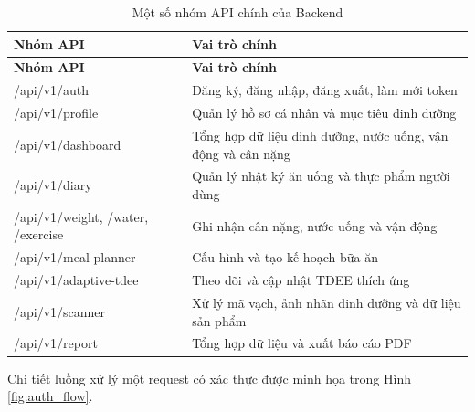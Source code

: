 \documentclass[12pt, a4paper]{report}
\begin{document}
\begin{longtable}{|>{\raggedright\arraybackslash}p{5cm}|p{10cm}|}
\caption{Một số nhóm API chính của Backend}
\label{tab:api_backend} \\
\hline
\textbf{Nhóm API} & \textbf{Vai trò chính} \\
\hline
\endfirsthead
\hline
\textbf{Nhóm API} & \textbf{Vai trò chính} \\
\hline
\endhead

/api/v1/auth & Đăng ký, đăng nhập, đăng xuất, làm mới token \\
\hline
/api/v1/profile & Quản lý hồ sơ cá nhân và mục tiêu dinh dưỡng \\
\hline
/api/v1/dashboard & Tổng hợp dữ liệu dinh dưỡng, nước uống, vận động và cân nặng \\
\hline
/api/v1/diary & Quản lý nhật ký ăn uống và thực phẩm người dùng \\
\hline
/api/v1/weight, /water, /exercise & Ghi nhận cân nặng, nước uống và vận động \\
\hline
/api/v1/meal-planner & Cấu hình và tạo kế hoạch bữa ăn \\
\hline
/api/v1/adaptive-tdee & Theo dõi và cập nhật TDEE thích ứng \\
\hline
/api/v1/scanner & Xử lý mã vạch, ảnh nhãn dinh dưỡng và dữ liệu sản phẩm \\
\hline
/api/v1/report & Tổng hợp dữ liệu và xuất báo cáo PDF \\
\hline
\end{longtable}

Chi tiết luồng xử lý một request có xác thực được minh họa trong Hình \ref{fig:auth_flow}.
\end{document}

